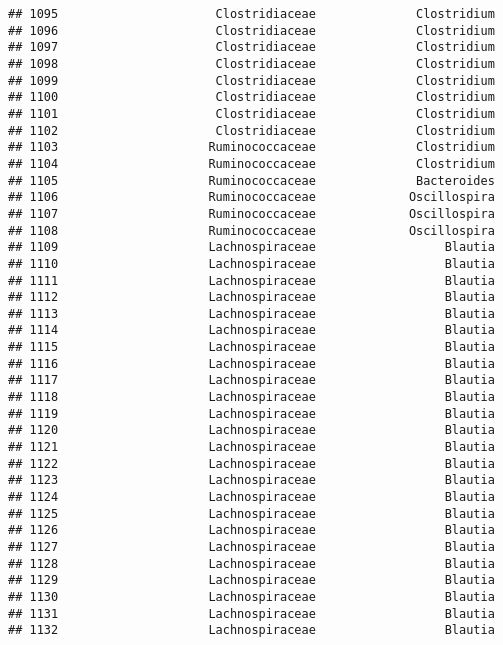 \documentclass[
]{article}
\begin{document}
\begin{verbatim}
## 1095                      Clostridiaceae              Clostridium
## 1096                      Clostridiaceae              Clostridium
## 1097                      Clostridiaceae              Clostridium
## 1098                      Clostridiaceae              Clostridium
## 1099                      Clostridiaceae              Clostridium
## 1100                      Clostridiaceae              Clostridium
## 1101                      Clostridiaceae              Clostridium
## 1102                      Clostridiaceae              Clostridium
## 1103                     Ruminococcaceae              Clostridium
## 1104                     Ruminococcaceae              Clostridium
## 1105                     Ruminococcaceae              Bacteroides
## 1106                     Ruminococcaceae             Oscillospira
## 1107                     Ruminococcaceae             Oscillospira
## 1108                     Ruminococcaceae             Oscillospira
## 1109                     Lachnospiraceae                  Blautia
## 1110                     Lachnospiraceae                  Blautia
## 1111                     Lachnospiraceae                  Blautia
## 1112                     Lachnospiraceae                  Blautia
## 1113                     Lachnospiraceae                  Blautia
## 1114                     Lachnospiraceae                  Blautia
## 1115                     Lachnospiraceae                  Blautia
## 1116                     Lachnospiraceae                  Blautia
## 1117                     Lachnospiraceae                  Blautia
## 1118                     Lachnospiraceae                  Blautia
## 1119                     Lachnospiraceae                  Blautia
## 1120                     Lachnospiraceae                  Blautia
## 1121                     Lachnospiraceae                  Blautia
## 1122                     Lachnospiraceae                  Blautia
## 1123                     Lachnospiraceae                  Blautia
## 1124                     Lachnospiraceae                  Blautia
## 1125                     Lachnospiraceae                  Blautia
## 1126                     Lachnospiraceae                  Blautia
## 1127                     Lachnospiraceae                  Blautia
## 1128                     Lachnospiraceae                  Blautia
## 1129                     Lachnospiraceae                  Blautia
## 1130                     Lachnospiraceae                  Blautia
## 1131                     Lachnospiraceae                  Blautia
## 1132                     Lachnospiraceae                  Blautia

\end{verbatim}
\end{document}
